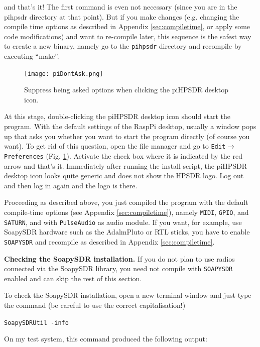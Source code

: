 \documentclass[12pt]{book}
\def\grtt#1{\texttt{\color{magenta}#1}}
\def\pH{pi\-HPSDR\xspace}
\begin{document}
and that's it! The first command is even not necessary (since you are in the pihpsdr
directory at that point).
But if you make changes (e.g. changing the compile time options as described in
Appendix \ref{sec:compiletime}, or apply some code modifications)
and want to re-compile later, this sequence is the safest way to create a new binary,
namely go to the \texttt{pihpsdr}
directory and recompile by executing ``make''.

\begin{figure}[h!]
\center
\texttt{[image: piDontAsk.png]}
\caption{Suppress being asked options when clicking the \pH desktop icon.}
\label{fig:piDontAsk}
\end{figure}

At this stage, double-clicking the \pH desktop icon should start the program.
With the default settings of the RaspPi desktop, usually a window pops up that
asks you whether you want to start the program directly (of course you want).
To get rid of this question, open the file manager
and go to
\texttt{Edit}$\to$\texttt{Preferences} (Fig. \ref{fig:piDontAsk}). Activate the check
box where it is indicated by the red arrow and that's it.
Immediately after running the install script, the \pH desktop icon
looks quite generic and does not show the HPSDR logo. Log out and then log in again
and the logo is there.

Proceeding as described above,  you  just compiled the program with
the default compile-time options (see Appendix \ref{sec:compiletime}), namely
\texttt{MIDI}, \texttt{GPIO}, and \texttt{SATURN}, and with \texttt{PulseAudio}
as audio module. If you want, for example, use SoapySDR hardware such as the AdalmPluto
or RTL sticks, you have to enable \texttt{SOAPYSDR} and recompile as described in
Appendix \ref{sec:compiletime}.

\bigskip

\textbf{\color{red}Checking the SoapySDR installation.}
If you do not plan to use radios connected via the SoapySDR library, you need not compile with \texttt{SOAPYSDR}
enabled and can skip the rest of this section.

To check the SoapySDR installation, open a new terminal
window and just type the command (be careful to use the correct capitalisation!)

\grtt{SoapySDRUtil -info}

On my test system, this command produced the following output:
\end{document}
